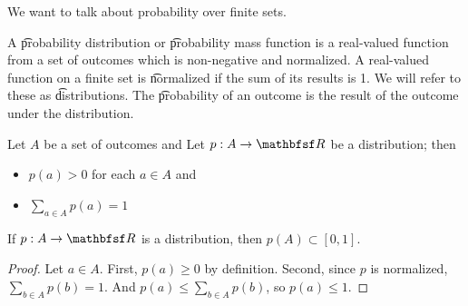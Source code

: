 
\sbasic
































\sstart
{}


We want to talk about probability over finite sets.


A \t{probability distribution} or \t{probability mass function} is a real-valued function from a set of outcomes which is non-negative and normalized.
A real-valued function on a finite set is \t{normalized} if the sum of its results is 1.
We will refer to these as \t{distributions}.
The \t{probability of an outcome} is the result of the outcome under the distribution.


Let $A$ be a set of outcomes and
Let $p: A \to \R$ be a distribution; then

\begin{itemize}

\item $p(a) > 0$ for each $a \in A$ and
\item $\sum_{a \in A} p(a) = 1$

\end{itemize}

\begin{prop}

If $p: A \to \R$ is a distribution, then $p(A) \subset [0, 1]$.

\begin{proof}

Let $a \in A$.
First, $p(a) \geq 0$ by definition.
Second, since $p$ is normalized, $\sum_{b \in A} p(b) = 1$.
And $p(a) \leq \sum_{b \in A} p(b)$, so $p(a) \leq 1$.

\end{proof}

\end{prop}

\strats
